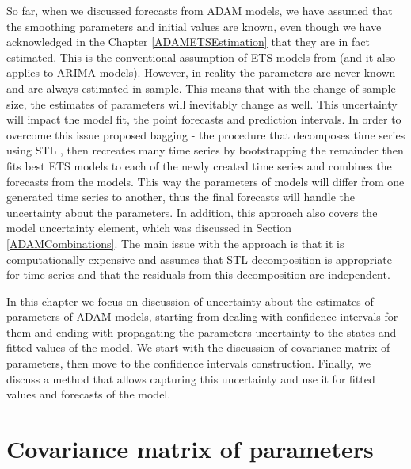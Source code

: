 \documentclass[
]{book}
\theoremstyle{definition}
\theoremstyle{definition}
\theoremstyle{definition}
\theoremstyle{definition}
\theoremstyle{remark}
\begin{document}
So far, when we discussed forecasts from ADAM models, we have assumed that the smoothing parameters and initial values are known, even though we have acknowledged in the Chapter \ref{ADAMETSEstimation} that they are in fact estimated. This is the conventional assumption of ETS models from \citet{Hyndman2008b} (and it also applies to ARIMA models). However, in reality the parameters are never known and are always estimated in sample. This means that with the change of sample size, the estimates of parameters will inevitably change as well. This uncertainty will impact the model fit, the point forecasts and prediction intervals. In order to overcome this issue \citet{Bergmeir2016} proposed bagging - the procedure that decomposes time series using STL \citep{Cleveland1990}, then recreates many time series by bootstrapping the remainder then fits best ETS models to each of the newly created time series and combines the forecasts from the models. This way \citep[as was explained by][]{Petropoulos2018} the parameters of models will differ from one generated time series to another, thus the final forecasts will handle the uncertainty about the parameters. In addition, this approach also covers the model uncertainty element, which was discussed in Section \ref{ADAMCombinations}. The main issue with the approach is that it is computationally expensive and assumes that STL decomposition is appropriate for time series and that the residuals from this decomposition are independent.

In this chapter we focus on discussion of uncertainty about the estimates of parameters of ADAM models, starting from dealing with confidence intervals for them and ending with propagating the parameters uncertainty to the states and fitted values of the model. We start with the discussion of covariance matrix of parameters, then move to the confidence intervals construction. Finally, we discuss a method that allows capturing this uncertainty and use it for fitted values and forecasts of the model.

\hypertarget{ADAMUncertaintyVCOV}{%
\section{Covariance matrix of parameters}\label{ADAMUncertaintyVCOV}}
\end{document}
